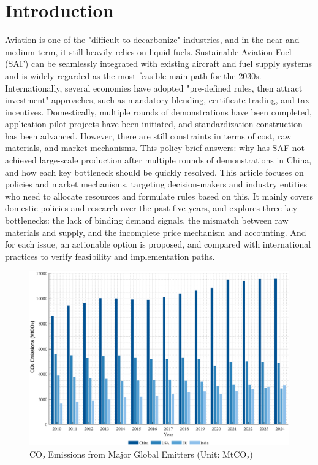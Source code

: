 \documentclass[a4paper,11pt]{article}
\begin{document}

\section{Introduction}
Aviation is one of the "difficult-to-decarbonize" industries, and in the near and medium term, it still heavily relies on liquid fuels. Sustainable Aviation Fuel (SAF) can be seamlessly integrated with existing aircraft and fuel supply systems and is widely regarded as the most feasible main path for the 2030s. Internationally, several economies have adopted "pre-defined rules, then attract investment" approaches, such as mandatory blending, certificate trading, and tax incentives. Domestically, multiple rounds of demonstrations have been completed, application pilot projects have been initiated, and standardization construction has been advanced. However, there are still constraints in terms of cost, raw materials, and market mechanisms. This policy brief answers: why has SAF not achieved large-scale production after multiple rounds of demonstrations in China, and how each key bottleneck should be quickly resolved. This article focuses on policies and market mechanisms, targeting decision-makers and industry entities who need to allocate resources and formulate rules based on this. It mainly covers domestic policies and research over the past five years, and explores three key bottlenecks: the lack of binding demand signals, the mismatch between raw materials and supply, and the incomplete price mechanism and accounting. And for each issue, an actionable option is proposed, and compared with international practices to verify feasibility and implementation paths.


\begin{figure}[htbp]
    \centering
    \includegraphics[width=0.9\linewidth]{global_co2_emissions.eps}
    \caption{CO₂ Emissions from Major Global Emitters (Unit: MtCO₂)}
    \label{fig:co2_emissions}
\end{figure}
\end{document}
